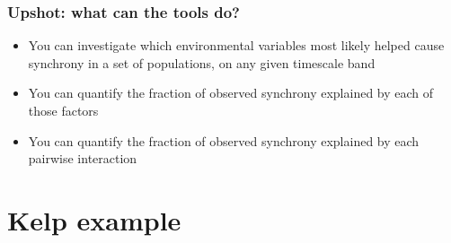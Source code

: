 \documentclass{beamer}
\begin{document}
% 


{
\begin{frame}
\frametitle{Upshot: what can the tools do?}
\begin{itemize}
\item You can investigate which environmental variables most likely helped cause synchrony in a set of populations, on any given timescale band
\item You can quantify the fraction of observed synchrony explained by each of those factors
\item You can quantify the fraction of observed synchrony explained by each pairwise interaction
\end{itemize}
\end{frame}}

\section{Kelp example}
\end{document}
